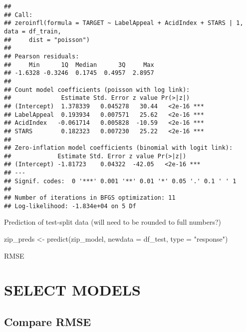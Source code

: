 \documentclass[
]{article}
\newenvironment{Shaded}{\begin{snugshade}}{\end{snugshade}}
\newcommand{\AttributeTok}[1]{\textcolor[rgb]{0.77,0.63,0.00}{#1}}
\newcommand{\DecValTok}[1]{\textcolor[rgb]{0.00,0.00,0.81}{#1}}
\newcommand{\FunctionTok}[1]{\textcolor[rgb]{0.00,0.00,0.00}{#1}}
\newcommand{\NormalTok}[1]{#1}
\newcommand{\OtherTok}[1]{\textcolor[rgb]{0.56,0.35,0.01}{#1}}
\newcommand{\SpecialCharTok}[1]{\textcolor[rgb]{0.00,0.00,0.00}{#1}}
\newcommand{\StringTok}[1]{\textcolor[rgb]{0.31,0.60,0.02}{#1}}
\begin{document}
\begin{verbatim}
## 
## Call:
## zeroinfl(formula = TARGET ~ LabelAppeal + AcidIndex + STARS | 1, data = df_train, 
##     dist = "poisson")
## 
## Pearson residuals:
##     Min      1Q  Median      3Q     Max 
## -1.6328 -0.3246  0.1745  0.4957  2.8957 
## 
## Count model coefficients (poisson with log link):
##              Estimate Std. Error z value Pr(>|z|)    
## (Intercept)  1.378339   0.045278   30.44   <2e-16 ***
## LabelAppeal  0.193934   0.007571   25.62   <2e-16 ***
## AcidIndex   -0.061714   0.005828  -10.59   <2e-16 ***
## STARS        0.182323   0.007230   25.22   <2e-16 ***
## 
## Zero-inflation model coefficients (binomial with logit link):
##             Estimate Std. Error z value Pr(>|z|)    
## (Intercept) -1.81723    0.04322  -42.05   <2e-16 ***
## ---
## Signif. codes:  0 '***' 0.001 '**' 0.01 '*' 0.05 '.' 0.1 ' ' 1 
## 
## Number of iterations in BFGS optimization: 11 
## Log-likelihood: -1.834e+04 on 5 Df
\end{verbatim}

Prediction of test-split data (will need to be rounded to full numbers?)

\begin{Shaded}
\begin{Highlighting}[]
\NormalTok{zip\_preds }\OtherTok{\textless{}{-}} \FunctionTok{predict}\NormalTok{(zip\_model, }\AttributeTok{newdata =}\NormalTok{ df\_test, }\AttributeTok{type =} \StringTok{"response"}\NormalTok{)}
\end{Highlighting}
\end{Shaded}

RMSE

\begin{Shaded}
\end{Shaded}

\hypertarget{select-models}{%
\section{SELECT MODELS}\label{select-models}}

\hypertarget{compare-rmse}{%
\subsection{Compare RMSE}\label{compare-rmse}}
\end{document}
